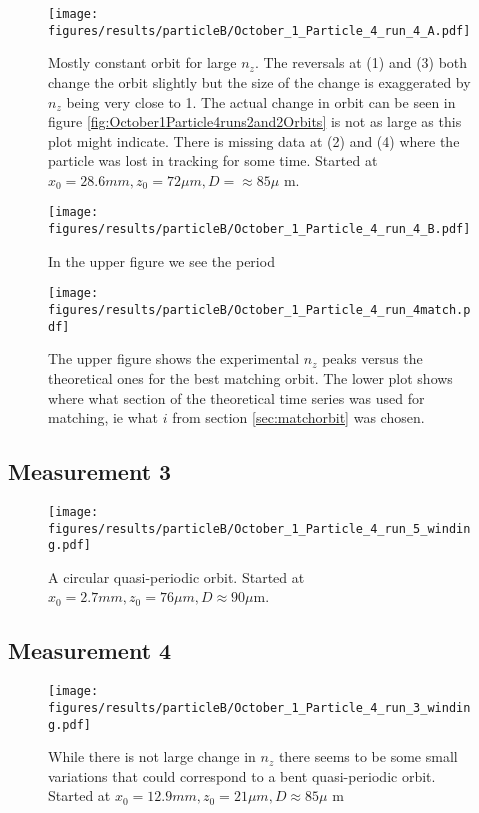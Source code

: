 \begin{figure}[H]
\begin{center}
\texttt{[image: figures/results/particleB/October\_1\_Particle\_4\_run\_4\_A.pdf]}
\end{center}
\caption{Mostly constant orbit for large $n_z$. The reversals at (1) and (3) both change the orbit slightly but the size of the change is exaggerated by $n_z$ being very close to 1. The actual change in orbit can be seen in figure \ref{fig:October1Particle4runs2and2Orbits} is not as large as this plot might indicate. There is missing data at (2) and (4) where the particle was lost in tracking for some time. Started at $x_0 = 28.6 mm, z_0 = 72\mu m, D = \approx 85\mu$ m. }
\label{fig:particleB2}
\end{figure}

\begin{figure}[H]
\centering
\texttt{[image: figures/results/particleB/October\_1\_Particle\_4\_run\_4\_B.pdf]}
\caption{In the upper figure we see the period }
\label{fig:particleB2sinking}
\end{figure}

\begin{figure}[H]
\centering
\texttt{[image: figures/results/particleB/October\_1\_Particle\_4\_run\_4match.pdf]}
\caption{The upper figure shows the experimental $n_z$ peaks versus the theoretical ones for the best matching orbit. The lower plot shows where what section of the theoretical time series was used for matching, ie what $i$ from section \ref{sec:matchorbit} was chosen.}
\label{fig:particleB2match}
\end{figure}




\subsection{Measurement 3}
\begin{figure}[H]
\begin{center}
\texttt{[image: figures/results/particleB/October\_1\_Particle\_4\_run\_5\_winding.pdf]}
\end{center}
\caption{A circular quasi-periodic orbit. Started at $x_0 = 2.7 mm, z_0 = 76\mu m, D \approx 90\mu$m.}
\label{fig:particleB3}
\end{figure}




\subsection{Measurement 4}
\begin{figure}[H]
\begin{center}
\texttt{[image: figures/results/particleB/October\_1\_Particle\_4\_run\_3\_winding.pdf]}
\end{center}
\caption{While there is not large change in $n_z$ there seems to be some small variations that could correspond to a bent quasi-periodic orbit. Started at $x_0 = 12.9 mm, z_0 = 21\mu m, D \approx 85\mu$ m}
\label{fig:particleB4}
\end{figure}
